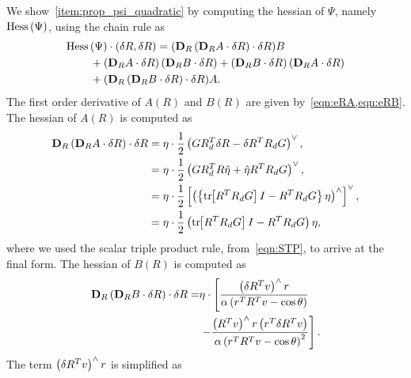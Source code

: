 \documentclass[10pt,fleqn]{IJCAS}  %
\begin{document}
\begin{multicols}{2}
We show~\cref{item:prop_psi_quadratic} by computing the hessian of \( \Psi \), namely \( \mathrm{Hess} \, (\Psi) \),  using the chain rule as 
\begin{align*}
    \Hess &(\Psi)\cdot (\delta R,\delta R)= (\mathbf{D}_R\parenth{\mathbf{D}_R A \cdot \delta R}\cdot \delta R) B\\
    & + \parenth{\dirDiff{A}{R} }\parenth{\dirDiff{B}{R}} 
    + \parenth{\dirDiff{B}{R} }\parenth{\dirDiff{A}{R}}\\ &+(\mathbf{D}_R\parenth{\mathbf{D}_R B \cdot \delta R}\cdot \delta R) A.
\end{align*}
The first order derivative of \( A(R) \) and \( B(R) \) are given by~\cref{eqn:eRA,eqn:eRB}. 
The hessian of \( A(R) \) is computed as 
\begin{align*}
    \mathbf{D}_{R} \left( \mathbf{D}_{R} A \cdot \delta R \right) \cdot \delta R &= \eta \cdot \frac{1}{2}\left( G R_d^T \delta R - \delta R^T R_d G \right)^\vee , \\
    &= \eta \cdot \frac{1}{2} \left( G R_d^T R \hat \eta + \hat \eta R^T R_d G \right)^\vee,\\
    &= \eta \cdot \frac{1}{2} \left[ \left( \left\{ \mathrm{tr}\negthickspace\left[ R^T R_d G \right] I - R^T R_d G \right\} \eta \right)^\wedge \right]^\vee , \\
    &= \eta \cdot \frac{1}{2} \left( \mathrm{tr}\negthickspace\left[ R^T R_d G \right] I - R^T R_d G \right)\eta ,
\end{align*}
where we used the scalar triple product rule, from~\cref{eqn:STP}, to arrive at the final form.
The hessian of \( B(R) \) is computed as
\begin{align*}
    \mathbf{D}_{R} \left( \mathbf{D}_{R} B \cdot \delta R \right) \cdot \delta R =& \eta \cdot \left[\frac{\left( \delta R^T v \right)^\wedge r}{\alpha\left( r^T R^T v - \cos \theta \right)} \right. \\
    & \left. - \frac{\left( R^T v \right)^\wedge r \left( r^T \delta R^T v \right)}{\alpha \left( r^TR^Tv - \cos \theta \right)^2}   \right] .
\end{align*}
The term \( \left( \delta R^T v \right)^\wedge r\) is simplified as

\end{multicols}
\end{document}

